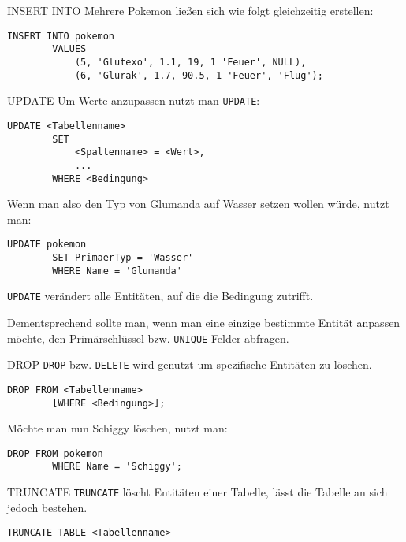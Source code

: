 \begin{example}{INSERT INTO}
    Mehrere Pokemon ließen sich wie folgt gleichzeitig erstellen:

    \begin{lstlisting}[language=mysql]
        INSERT INTO pokemon
        VALUES
            (5, 'Glutexo', 1.1, 19, 1 'Feuer', NULL),
            (6, 'Glurak', 1.7, 90.5, 1 'Feuer', 'Flug');
    \end{lstlisting}
\end{example}

\begin{sql}{UPDATE}
    Um Werte anzupassen nutzt man \texttt{UPDATE}:

    \begin{lstlisting}[language=mysql]
        UPDATE <Tabellenname>
        SET
            <Spaltenname> = <Wert>,
            ...
        WHERE <Bedingung>
    \end{lstlisting}

    Wenn man also den Typ von Glumanda auf Wasser setzen wollen würde, nutzt man:

    \begin{lstlisting}[language=mysql]
        UPDATE pokemon
        SET PrimaerTyp = 'Wasser'
        WHERE Name = 'Glumanda'
    \end{lstlisting}

    \texttt{UPDATE} verändert alle Entitäten, auf die die Bedingung zutrifft.

    Dementsprechend sollte man, wenn man eine einzige bestimmte Entität anpassen möchte, den Primärschlüssel bzw. \texttt{UNIQUE} Felder abfragen.
\end{sql}

\begin{sql}{DROP}
    \texttt{DROP} bzw. \texttt{DELETE} wird genutzt um spezifische Entitäten zu löschen.

    \begin{lstlisting}[language=mysql]
        DROP FROM <Tabellenname>
        [WHERE <Bedingung>];
    \end{lstlisting}

    Möchte man nun Schiggy löschen, nutzt man:

    \begin{lstlisting}[language=mysql]
        DROP FROM pokemon
        WHERE Name = 'Schiggy';
    \end{lstlisting}
\end{sql}

\begin{sql}{TRUNCATE}
    \texttt{TRUNCATE} löscht Entitäten einer Tabelle, lässt die Tabelle an sich jedoch bestehen.

    \begin{lstlisting}[language=mysql]
        TRUNCATE TABLE <Tabellenname>        
    \end{lstlisting}
\end{sql}

